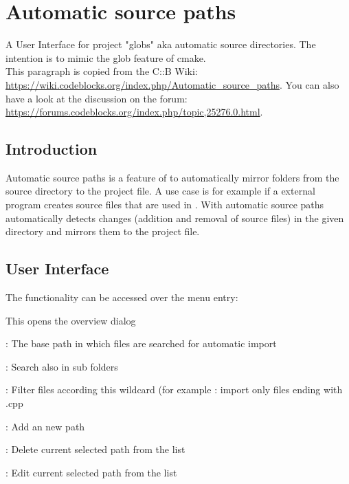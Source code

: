 \section{Automatic source paths}\label{sec:automatic_source_paths}
A User Interface for project "globs" aka automatic source directories. The intention is to mimic the glob feature of cmake.\\
This paragraph is copied from the C::B Wiki: \url{https://wiki.codeblocks.org/index.php/Automatic_source_paths}.
You can also have a look at the discussion on the forum: \url{https://forums.codeblocks.org/index.php/topic,25276.0.html}.

\subsection{Introduction}
Automatic source paths is a feature of \codeblocks to automatically mirror folders from the source directory to the \codeblocks project file. A use case is for example if a external program creates source files that are used in \codeblocks. With automatic source paths \codeblocks automatically detects changes (addition and removal of source files) in the given directory and mirrors them to the project file.
\subsection{User Interface}
The functionality can be accessed over the  menu entry:


This opens the overview dialog

\begin{description}[noitemsep]
\item[Path]: The base path in which files are searched for automatic import
\item[Recursive]: Search also in sub folders
\item[Wildcard]: Filter files according this wildcard (for example : import only files ending with .cpp
\item[Add]: Add an new path
\item[Delete]: Delete current selected path from the list
\item[Edit]: Edit current selected path from the list
\end{description}

